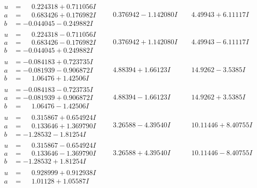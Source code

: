 \documentclass[1p]{elsarticle_modified}
\theoremstyle{definition}
\begin{document}
$$\begin{array}{c|c|c}
\begin{aligned}
u &= \phantom{-}0.224318 + 0.711056 I \\
a &= \phantom{-}0.683426 + 0.176982 I \\
b &= -0.044045 - 0.249882 I\end{aligned}
 & \phantom{-}0.376942 - 1.142080 I & \phantom{-}4.49943 + 6.11117 I \\ \hline\begin{aligned}
u &= \phantom{-}0.224318 - 0.711056 I \\
a &= \phantom{-}0.683426 - 0.176982 I \\
b &= -0.044045 + 0.249882 I\end{aligned}
 & \phantom{-}0.376942 + 1.142080 I & \phantom{-}4.49943 - 6.11117 I \\ \hline\begin{aligned}
u &= -0.084183 + 0.723735 I \\
a &= -0.081939 - 0.906872 I \\
b &= \phantom{-}1.06476 + 1.42506 I\end{aligned}
 & \phantom{-}4.88394 + 1.66123 I & \phantom{-}14.9262 - 3.5385 I \\ \hline\begin{aligned}
u &= -0.084183 - 0.723735 I \\
a &= -0.081939 + 0.906872 I \\
b &= \phantom{-}1.06476 - 1.42506 I\end{aligned}
 & \phantom{-}4.88394 - 1.66123 I & \phantom{-}14.9262 + 3.5385 I \\ \hline\begin{aligned}
u &= \phantom{-}0.315867 + 0.654924 I \\
a &= \phantom{-}0.133646 + 1.369790 I \\
b &= -1.28532 - 1.81254 I\end{aligned}
 & \phantom{-}3.26588 - 4.39540 I & \phantom{-}10.11446 + 8.40755 I \\ \hline\begin{aligned}
u &= \phantom{-}0.315867 - 0.654924 I \\
a &= \phantom{-}0.133646 - 1.369790 I \\
b &= -1.28532 + 1.81254 I\end{aligned}
 & \phantom{-}3.26588 + 4.39540 I & \phantom{-}10.11446 - 8.40755 I \\ \hline\begin{aligned}
u &= \phantom{-}0.928999 + 0.912938 I \\
a &= \phantom{-}1.01128 + 1.05587 I \\

\end{aligned}
\end{array}$$
\end{document}
